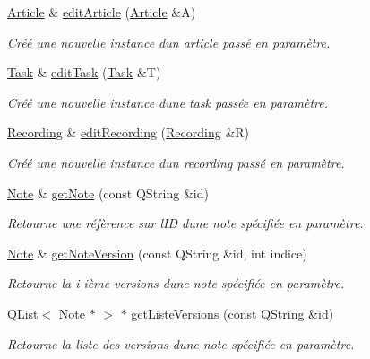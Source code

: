 \begin{DoxyCompactItemize}
\hyperlink{class_article}{Article} \& \hyperlink{class_notes_manager_a3259c7aa22b5f2eee6f7bceddc707b1d}{edit\+Article} (\hyperlink{class_article}{Article} \&A)
\begin{DoxyCompactList}\small\item\em Créé une nouvelle instance d\textquotesingle{}un article passé en paramètre. \end{DoxyCompactList}\item 
\hyperlink{class_task}{Task} \& \hyperlink{class_notes_manager_a8f8f2b6aaa8c7d41356f9e4be7da2da5}{edit\+Task} (\hyperlink{class_task}{Task} \&T)
\begin{DoxyCompactList}\small\item\em Créé une nouvelle instance d\textquotesingle{}une task passée en paramètre. \end{DoxyCompactList}\item 
\hyperlink{class_recording}{Recording} \& \hyperlink{class_notes_manager_a1c4cfa021a12b6416c4e800d643b5e0a}{edit\+Recording} (\hyperlink{class_recording}{Recording} \&R)
\begin{DoxyCompactList}\small\item\em Créé une nouvelle instance d\textquotesingle{}un recording passé en paramètre. \end{DoxyCompactList}\item 
\hyperlink{class_note}{Note} \& \hyperlink{class_notes_manager_a9c401bfe7c91ab37a7c8c4db398e92ff}{get\+Note} (const Q\+String \&id)
\begin{DoxyCompactList}\small\item\em Retourne une réfèrence sur l\textquotesingle{}ID d\textquotesingle{}une note spécifiée en paramètre. \end{DoxyCompactList}\item 
\hyperlink{class_note}{Note} \& \hyperlink{class_notes_manager_a0461145357fe17bf07c3b09c665b95db}{get\+Note\+Version} (const Q\+String \&id, int indice)
\begin{DoxyCompactList}\small\item\em Retourne la i-\/ième versions d\textquotesingle{}une note spécifiée en paramètre. \end{DoxyCompactList}\item 
Q\+List$<$ \hyperlink{class_note}{Note} $\ast$ $>$ $\ast$ \hyperlink{class_notes_manager_ae3af78108c46b9816207e66fcde64c5b}{get\+Liste\+Versions} (const Q\+String \&id)
\begin{DoxyCompactList}\small\item\em Retourne la liste des versions d\textquotesingle{}une note spécifiée en paramètre. \end{DoxyCompactList}\item 

\end{DoxyCompactItemize}
